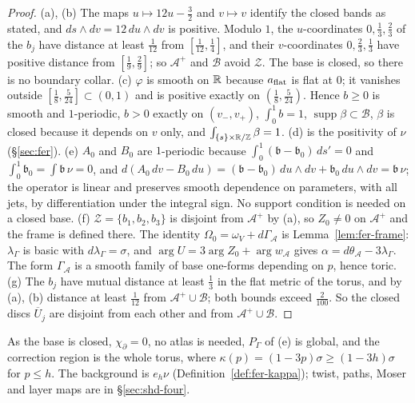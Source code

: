 \begin{proof}
(a), (b) The maps $u\mapsto12u-\frac32$ and $v\mapsto v$ identify the closed bands as stated, and $ds\wedge dv=12\,du\wedge dv$ is
positive. Modulo $1$, the $u$-coordinates $0,\frac13,\frac23$ of the $b_j$ have distance at least $\frac1{12}$ from
$[\frac1{12},\frac14]$, and their $v$-coordinates $0,\frac23,\frac13$ have positive distance from $[\frac19,\frac29]$;
so $\mathcal A^+$ and $\mathcal B$ avoid $\mathcal Z$. The base is closed, so there is no boundary collar.
(c) $\varphi$ is smooth on $\mathbb{R}$ because $a_{\rm flat}$ is flat at $0$; it vanishes outside $[\frac18,\frac5{24}]\subset(0,1)$ and is
positive exactly on $(\frac18,\frac5{24})$. Hence $b\ge0$ is smooth and $1$-periodic, $b>0$ exactly on $(v_-,v_+)$,
$\int_0^1b=1$, $\operatorname{supp}\beta\subset\mathcal B$, $\beta$ is closed because it depends on $v$ only, and
$\int_{\{s\}\times\mathbb{R}/\mathbb{Z}}\beta=1$.
(d) is the positivity of $\nu$ (\S\ref{sec:fer}).
(e) $A_0$ and $B_0$ are $1$-periodic because $\int_0^1(\mathfrak b-\mathfrak b_0)\,ds'=0$ and $\int_0^1\mathfrak b_0=\int\mathfrak b\,\nu=0$,
and $d(A_0\,dv-B_0\,du)=(\mathfrak b-\mathfrak b_0)\,du\wedge dv+\mathfrak b_0\,du\wedge dv=\mathfrak b\,\nu$; the operator is linear and
preserves smooth dependence on parameters, with all jets, by differentiation under the integral sign. No support
condition is needed on a closed base.
(f) $\mathcal Z=\{b_1,b_2,b_3\}$ is disjoint from $\mathcal A^+$ by (a), so $Z_0\ne0$ on $\mathcal A^+$ and the frame
is defined there. The identity $\Omega_0=\omega_V+d\Gamma_{\mathcal A}$ is Lemma~\ref{lem:fer-frame}: $\lambda_\Gamma$ is basic
with $d\lambda_\Gamma=\sigma$, and $\arg U=3\arg Z_0+\arg w_{\mathcal A}$ gives $\alpha=d\theta_{\mathcal A}-3\lambda_\Gamma$. The form
$\Gamma_{\mathcal A}$ is a smooth family of base one-forms depending on $p$, hence toric.
(g) The $b_j$ have mutual distance at least $\frac13$ in the flat metric of the torus, and by (a), (b) distance at least
$\frac1{12}$ from $\mathcal A^+\cup\mathcal B$; both bounds exceed $\frac2{100}$. So the closed discs $\overline U_j$ are disjoint from
each other and from $\mathcal A^+\cup\mathcal B$.
\end{proof}

As the base is closed, $\chi_\partial=0$, no atlas is needed, $P_\Gamma$ of (e) is global, and the correction region is the whole torus, where $\kappa(p)=(1-3p)\sigma\ge(1-3h)\sigma$ for $p\le h$. The background is $e_h\nu$ (Definition~\ref{def:fer-kappa}); twist, paths, Moser and layer maps are in \S\ref{sec:shd-four}.

